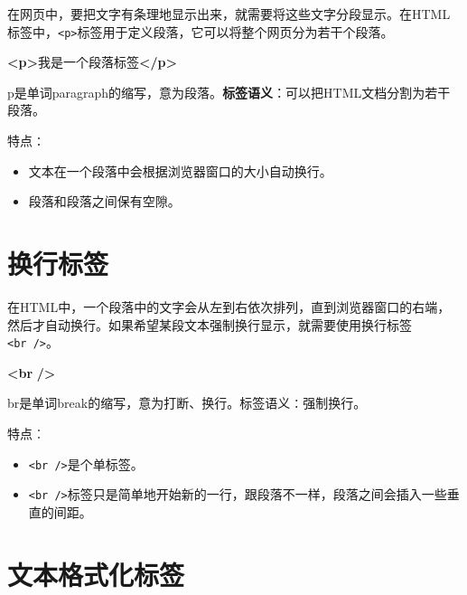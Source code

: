 \documentclass[
]{book}
\newenvironment{Shaded}{\begin{snugshade}}{\end{snugshade}}
\newcommand{\KeywordTok}[1]{\textcolor[rgb]{0.13,0.29,0.53}{\textbf{#1}}}
\newcommand{\NormalTok}[1]{#1}
\providecommand{\tightlist}{%
  \setlength{\itemsep}{0pt}\setlength{\parskip}{0pt}}
\begin{document}
在网页中，要把文字有条理地显示出来，就需要将这些文字分段显示。在HTML标签中，\texttt{\textless{}p\textgreater{}}标签用于定义段落，它可以将整个网页分为若干个段落。

\begin{Shaded}
\begin{Highlighting}[]
\KeywordTok{\textless{}p\textgreater{}}\NormalTok{我是一个段落标签}\KeywordTok{\textless{}/p\textgreater{}}
\end{Highlighting}
\end{Shaded}

p是单词paragraph的缩写，意为段落。\textbf{标签语义}：可以把HTML文档分割为若干段落。

特点∶

\begin{itemize}
\tightlist
\item
  文本在一个段落中会根据浏览器窗口的大小自动换行。
\item
  段落和段落之间保有空隙。
\end{itemize}

\hypertarget{ux6362ux884cux6807ux7b7e}{%
\section{换行标签}\label{ux6362ux884cux6807ux7b7e}}

在HTML中，一个段落中的文字会从左到右依次排列，直到浏览器窗口的右端，然后才自动换行。如果希望某段文本强制换行显示，就需要使用换行标签\texttt{\textless{}br\ /\textgreater{}}。

\begin{Shaded}
\begin{Highlighting}[]
\KeywordTok{\textless{}br} \KeywordTok{/\textgreater{}}
\end{Highlighting}
\end{Shaded}

br是单词break的缩写，意为打断、换行。标签语义∶强制换行。

特点︰

\begin{itemize}
\tightlist
\item
  \texttt{\textless{}br\ /\textgreater{}}是个单标签。
\item
  \texttt{\textless{}br\ /\textgreater{}}标签只是简单地开始新的一行，跟段落不一样，段落之间会插入一些垂直的间距。
\end{itemize}

\hypertarget{ux6587ux672cux683cux5f0fux5316ux6807ux7b7e}{%
\section{文本格式化标签}\label{ux6587ux672cux683cux5f0fux5316ux6807ux7b7e}}
\end{document}
